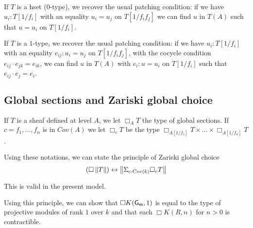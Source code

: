 \medskip

If $T$ is a hset ($0$-type), we recover the usual patching condition: if we have $u_i:T[1/f_i]$ with an equality $u_i = u_j$ on
$T[1/f_if_j]$ we can find $u$ in $T(A)$ such that $u = u_i$ on $T[1/f_i]$.

If $T$ is a $1$-type, we recover the usual patching condition: if we have $u_i:T[1/f_i]$ with an equality $e_{ij}:u_i = u_j$ on
$T[1/f_if_j]$, with the cocycle condition $e_{ij}\cdot e_{jk} = e_{ik}$,
we can find $u$ in $T(A)$ with $e_i:u = u_i$ on $T[1/f_i]$ such that $e_{ij}\cdot e_j = e_i$.





\subsection{Global sections and Zariski global choice}

If $T$ is a sheaf defined at level $A$, we let $\Box_A T$ the type of global sections.
If $c = f_1,\dots,f_n$ is in $Cov(A)$ we let $\Box_c T$ be the type $\Box_{A[1/f_1]}T\times\dots\times\Box_{A[1/f_n]}T$.

Using these notations, we can state the principle of Zariski global choice
$$
(\Box \left\lVert T \right\rVert)\leftrightarrow \left\lVert \Sigma_{c:Cov(k)}\Box_c T \right\rVert
$$

This is valid in the present model.

Using this principle, we can show that $\Box K(\mathsf{G_m},1)$ is equal to the type of projective modules of rank $1$ over $k$
and that each $\Box K(R,n)$ for $n>0$ is contractible.
                                                                                  




 
